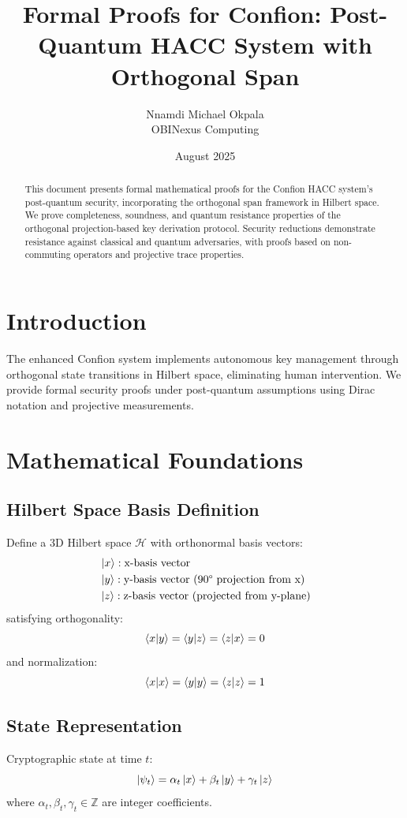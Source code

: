 \documentclass[12pt]{article}
\title{Formal Proofs for Confion: Post-Quantum HACC System with Orthogonal Span}
\author{Nnamdi Michael Okpala \\ OBINexus Computing}
\date{August 2025}
\begin{document}
\maketitle

\begin{abstract}
This document presents formal mathematical proofs for the Confion HACC system's post-quantum security, incorporating the orthogonal span framework in Hilbert space. We prove completeness, soundness, and quantum resistance properties of the orthogonal projection-based key derivation protocol. Security reductions demonstrate resistance against classical and quantum adversaries, with proofs based on non-commuting operators and projective trace properties.
\end{abstract}

\section{Introduction}
The enhanced Confion system implements autonomous key management through orthogonal state transitions in Hilbert space, eliminating human intervention. We provide formal security proofs under post-quantum assumptions using Dirac notation and projective measurements.

\section{Mathematical Foundations}

\subsection{Hilbert Space Basis Definition}
Define a 3D Hilbert space $\mathcal{H}$ with orthonormal basis vectors:
\begin{align*}
&\ket{x}: \text{x-basis vector} \\
&\ket{y}: \text{y-basis vector (90° projection from x)} \\
&\ket{z}: \text{z-basis vector (projected from y-plane)}
\end{align*}
satisfying orthogonality:
\[
\braket{x|y} = \braket{y|z} = \braket{z|x} = 0
\]
and normalization:
\[
\braket{x|x} = \braket{y|y} = \braket{z|z} = 1
\]

\subsection{State Representation}
Cryptographic state at time $t$:
\[
\ket{\psi_t} = \alpha_t\ket{x} + \beta_t\ket{y} + \gamma_t\ket{z}
\]
where $\alpha_t, \beta_t, \gamma_t \in \mathbb{Z}$ are integer coefficients.
\end{document}
